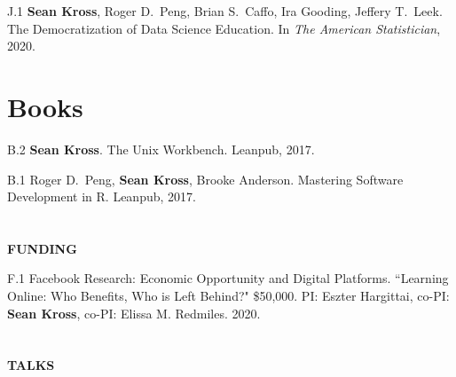 \begin{bibenum}

\item[J.1] \textbf{Sean Kross}, Roger D.\ Peng, Brian S.\ Caffo, Ira Gooding,
Jeffery T.\ Leek. The Democratization of Data Science Education. 
In \emph{The American Statistician}, 2020.

\end{bibenum}

\vspace{0.1in}

\section{Books}

\begin{bibenum}

\item[B.2] \textbf{Sean Kross}. The Unix Workbench. Leanpub, 2017.

\item[B.1] Roger D.\ Peng, \textbf{Sean Kross}, Brooke Anderson. Mastering 
Software Development in R. Leanpub, 2017.

\end{bibenum}


\section{} \vspace{0.2in} \textbf{FUNDING} \vspace{0.05in}

\begin{bibenum}

\item[F.1] Facebook Research: Economic Opportunity and Digital Platforms. ``Learning Online: Who Benefits, Who is Left Behind?" \$50,000. PI: Eszter Hargittai, co-PI: \textbf{Sean Kross}, co-PI: Elissa M. Redmiles. 2020.

\end{bibenum}

\vspace{0.1in}

\section{} \textbf{TALKS} \vspace{0.05in}


